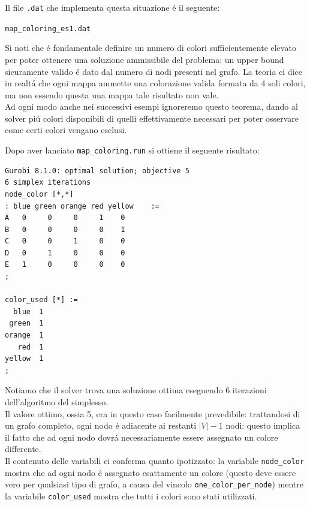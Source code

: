 \documentclass{article}
\begin{document}
Il file \texttt{.dat} che implementa questa situazione \'e il seguente:

\vspace{5mm}
\texttt{map\_coloring\_es1.dat}

\vspace{5mm}

Si noti che \'e fondamentale definire un numero di colori sufficientemente elevato per poter ottenere una soluzione ammissibile del problema: un upper bound sicuramente valido \'e dato dal numero di nodi presenti nel grafo. La teoria ci dice in realt\'a che ogni mappa ammette una colorazione valida formata da 4 soli colori, ma non essendo questa una mappa tale risultato non vale.\\
Ad ogni modo anche nei successivi esempi ignoreremo questo teorema, dando al solver pi\'u colori disponibili di quelli effettivamente necessari per poter osservare come certi colori vengano esclusi.\\

\pagebreak

Dopo aver lanciato \texttt{map\_coloring.run} si ottiene il seguente risultato:\\

\begin{verbatim}
Gurobi 8.1.0: optimal solution; objective 5
6 simplex iterations
node_color [*,*]
: blue green orange red yellow    :=
A   0     0     0     1    0
B   0     0     0     0    1
C   0     0     1     0    0
D   0     1     0     0    0
E   1     0     0     0    0
;

color_used [*] :=
  blue  1
 green  1
orange  1
   red  1
yellow  1
;
\end{verbatim}

Notiamo che il solver trova una soluzione ottima eseguendo 6 iterazioni dell'algoritmo del simplesso.\\
Il valore ottimo, ossia 5, era in questo caso facilmente prevedibile: trattandosi di un grafo completo, ogni nodo \'e adiacente ai restanti $|V| - 1$ nodi: questo implica il fatto che ad ogni nodo dovr\'a necessariamente essere assegnato un colore differente.\\
Il contenuto delle variabili ci conferma quanto ipotizzato: la variabile \texttt{node\_color} mostra che ad ogni nodo \'e assegnato esattamente un colore (questo deve essere vero per qualsiasi tipo di grafo, a causa del vincolo \texttt{one\_color\_per\_node}) mentre la variabile \texttt{color\_used} mostra che tutti i colori sono stati utilizzati.\\
\end{document}
